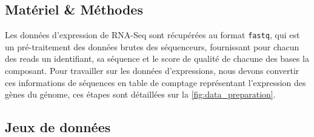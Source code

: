 \documentclass[12pt,a4paper]{report}
\begin{document}
\begin{onehalfspace}
\chapter*{Matériel \& Méthodes}

Les données d'expression de RNA-Seq sont récupérées au format \texttt{fastq}, qui est un pré-traitement des données brutes des séquenceurs, fournissant pour chacun des \gls{reads} un identifiant, sa séquence et le score de qualité de chacune des bases la composant. Pour travailler sur les données d'expressions, nous devons convertir ces informations de séquences en table de comptage représentant l'expression des gènes du génome, ces étapes sont détaillées sur la \autoref{fig:data_preparation}.

\begin{figure}
\end{figure}

\section*{Jeux de données}


\end{onehalfspace}
\end{document}
